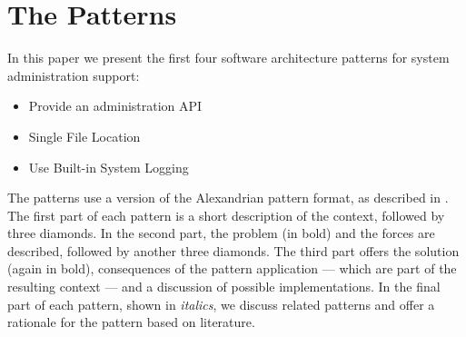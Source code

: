 \section{The Patterns}

In this paper we present the first four software architecture patterns for system administration support: 
\begin{itemize} 
	\item {\sc Provide an administration API}
	\item {\sc Single File Location}
	\item {\sc Use Built-in System Logging}
\end{itemize}

The patterns use a version of the Alexandrian pattern format, as described in \cite{alexander1977}. The first part of each pattern is a short description of the context, followed by three diamonds. In the second part, the problem (in bold) and the forces are described, followed by another three diamonds. The third part offers the solution (again in bold), consequences of the pattern application --- which are part of the resulting context --- and a discussion of possible implementations. In the final part of each pattern, shown in \textit{italics}, we discuss related patterns and offer a rationale for the pattern based on literature.
